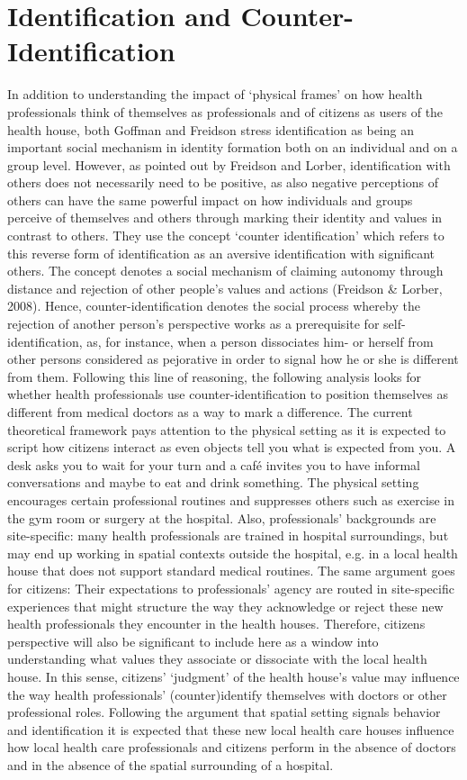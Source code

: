 \section{Identification and Counter-Identification}
In addition to understanding the impact of ‘physical frames’ on how health professionals think of themselves as professionals and of citizens as users of the health house, both Goffman and Freidson stress identification as being an important social mechanism in identity formation both on an individual and on a group level. However, as pointed out by Freidson and Lorber, identification with others does not necessarily need to be positive, as also negative perceptions of others can have the same powerful impact on how individuals and groups perceive of themselves and others through marking their identity and values in contrast to others. They use the concept ‘counter identification’ which refers to this reverse form of identification as an aversive identification with significant others. The concept denotes a social mechanism of claiming autonomy through distance and rejection of other people’s values and actions (Freidson \& Lorber, 2008). Hence, counter-identification denotes the social process whereby the rejection of another person’s perspective works as a prerequisite for self-identification, as, for instance, when a person dissociates him- or herself from other persons considered as pejorative in order to signal how he or she is different from them. Following this line of reasoning, the following analysis looks for whether health professionals use counter-identification to position themselves as different from medical doctors as a way to mark a difference. The current theoretical framework pays attention to the physical setting as it is expected to script how citizens interact as even objects tell you what is expected from you. A desk asks you to wait for your turn and a café invites you to have informal conversations and maybe to eat and drink something. The physical setting encourages certain professional routines and suppresses others such as exercise in the gym room or surgery at the hospital. Also, professionals’ backgrounds are site-specific: many health professionals are trained in hospital surroundings, but may end up working in spatial contexts outside the hospital, e.g. in a local health house that does not support standard medical routines. The same argument goes for citizens: Their expectations to professionals’ agency are routed in site-specific experiences that might structure the way they acknowledge or reject these new health professionals they encounter in the health houses. Therefore, citizens perspective will also be significant to include here as a window into understanding what values they associate or dissociate with the local health house. In this sense, citizens’ ‘judgment’ of the health house’s value may influence the way health professionals’ (counter)identify themselves with doctors or other professional roles. Following the argument that spatial setting signals behavior and identification it is expected that these new local health care houses influence how local health care professionals and citizens perform in the absence of doctors and in the absence of the spatial surrounding of a hospital. 

